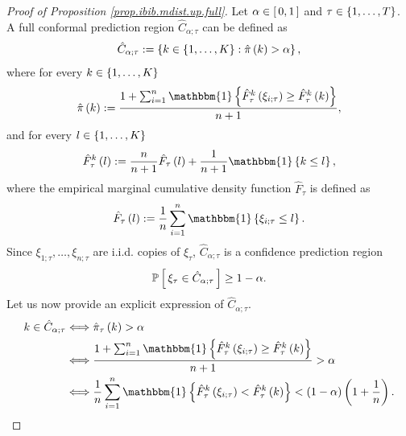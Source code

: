 \documentclass[11pt]{article}
\begin{document}
\begin{proof}[Proof of Proposition \ref{prop.ibib.mdist.up.full}]
Let $\alpha \in \left[\, 0, 1 \,\right]$ and $\tau \in \left\{ 1, \ldots, T \right\}$.
A full conformal prediction region $\hat{C}_{\alpha; \tau}$ can be defined as
\begin{align*}
    \hat{C}_{\alpha; \tau}
    := \left\{ 
        k \in \left\{ 1, \ldots, K \right\}:
        \hat{\pi}\left( k \right) > \alpha
     \right\},
\end{align*}
where for every $k \in \left\{ 1, \ldots, K \right\}$
\begin{align*}
    \hat{\pi}\paren{k} :=
    \frac{1 
        + \sum_{i=1}^{n}
        \mathbbm{1}
        \brac{
            \hat{F}_{\tau}^{k} \paren{\xi_{i; \tau}}
            \geq \hat{F}_{\tau}^{k} \paren{k}
        }
    }{n+1},
\end{align*}
and for every $l \in \left\{ 1, \ldots, K \right\}$
\begin{align*}
    \hat{F}_{\tau}^{k} \paren{l}
    := \frac{n}{n+1} \hat{F}_{\tau}\paren{l}
    + \frac{1}{n+1} \mathbbm{1} \brac{k \leq l},
\end{align*}
where the empirical marginal cumulative density function $\hat{F}_{\tau}$ is defined as
\begin{align}
    \label{eq.ecdf.full}
    \hat{F}_{\tau} \paren{l}
    := \frac{1}{n} \sum_{i=1}^{n} \mathbbm{1} \brac{\xi_{i; \tau} \leq l}.
\end{align}
%
%
%
Since $\xi_{1; \tau}, \ldots, \xi_{n; \tau}$ are i.i.d. copies of $\xi_{\tau}$,
$\hat{C}_{\alpha; \tau}$ is a confidence prediction region \citep{vovk2005algorithmic}
\begin{align*}
    \mathbb{P} \left[\, 
        \xi_{\tau} \in \hat{C}_{\alpha; \tau}
     \,\right] \geq 1 - \alpha.
\end{align*}
%
%
%
Let us now provide an explicit expression of $\hat{C}_{\alpha; \tau}$.
\begin{align*}
    k \in \hat{C}_{\alpha; \tau}
    &
    \Longleftrightarrow
    \hat{\pi}_{\tau}\paren {k} > \alpha
    \\
    &\Longleftrightarrow
    \frac{1 
        + \sum_{i=1}^{n}
        \mathbbm{1}
        \brac{
            \hat{F}_{\tau}^{k} \paren{\xi_{i; \tau}}
            \geq \hat{F}_{\tau}^{k} \paren{k}
        }
    }{n+1} > \alpha
    \\
    &\Longleftrightarrow
    \frac{1}{n}
    \sum_{i=1}^{n}
    \mathbbm{1}
    \brac{
        \hat{F}_{\tau}^{k} \paren{\xi_{i; \tau}}
        < \hat{F}_{\tau}^{k} \paren{k}
    }
    <
    \paren{1 - \alpha} \paren{1 + \frac{1}{n}}.

\end{align*}
\end{proof}
\end{document}
